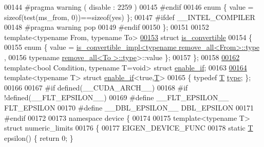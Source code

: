 \begin{DoxyCode}
00144 \textcolor{preprocessor}{  #pragma warning ( disable : 2259 )}
00145 \textcolor{preprocessor}{#endif}
00146   \textcolor{keyword}{enum} \{ value = \textcolor{keyword}{sizeof}(test(ms\_from, 0))==\textcolor{keyword}{sizeof}(yes) \};
00147 \textcolor{preprocessor}{#ifdef \_\_INTEL\_COMPILER}
00148 \textcolor{preprocessor}{  #pragma warning pop}
00149 \textcolor{preprocessor}{#endif}
00150 \};
00151 
00152 \textcolor{keyword}{template}<\textcolor{keyword}{typename} From, \textcolor{keyword}{typename} To>
\hyperlink{struct_eigen_1_1internal_1_1is__convertible}{00153} \textcolor{keyword}{struct }\hyperlink{struct_eigen_1_1internal_1_1is__convertible}{is\_convertible}
00154 \{
00155   \textcolor{keyword}{enum} \{ value = \hyperlink{struct_eigen_1_1internal_1_1is__convertible__impl}{is\_convertible\_impl<typename remove\_all<From>::type}
      ,
00156                                      \textcolor{keyword}{typename} \hyperlink{group___sparse_core___module}{remove\_all<To  >::type}>::value \};
00157 \};
00158 
\hyperlink{struct_eigen_1_1internal_1_1enable__if}{00162} \textcolor{keyword}{template}<\textcolor{keywordtype}{bool} Condition, \textcolor{keyword}{typename} T=\textcolor{keywordtype}{void}> \textcolor{keyword}{struct }\hyperlink{struct_eigen_1_1internal_1_1enable__if}{enable\_if};
00163 
\hyperlink{struct_eigen_1_1internal_1_1enable__if_3_01true_00_01_t_01_4}{00164} \textcolor{keyword}{template}<\textcolor{keyword}{typename} T> \textcolor{keyword}{struct }\hyperlink{struct_eigen_1_1internal_1_1enable__if}{enable\_if}<true,\hyperlink{group___sparse_core___module}{T}>
00165 \{ \textcolor{keyword}{typedef} \hyperlink{group___sparse_core___module}{T} \hyperlink{group___sparse_core___module}{type}; \};
00166 
00167 \textcolor{preprocessor}{#if defined(\_\_CUDA\_ARCH\_\_)}
00168 \textcolor{preprocessor}{#if !defined(\_\_FLT\_EPSILON\_\_)}
00169 \textcolor{preprocessor}{#define \_\_FLT\_EPSILON\_\_ FLT\_EPSILON}
00170 \textcolor{preprocessor}{#define \_\_DBL\_EPSILON\_\_ DBL\_EPSILON}
00171 \textcolor{preprocessor}{#endif}
00172 
00173 \textcolor{keyword}{namespace }device \{
00174 
00175 \textcolor{keyword}{template}<\textcolor{keyword}{typename} T> \textcolor{keyword}{struct }numeric\_limits
00176 \{
00177   EIGEN\_DEVICE\_FUNC
00178   \textcolor{keyword}{static} \hyperlink{group___sparse_core___module}{T} epsilon() \{ \textcolor{keywordflow}{return} 0; \}

\end{DoxyCode}
